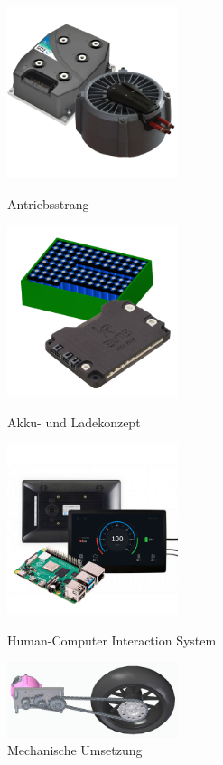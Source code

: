 \begin{figure}[H] 
    \RawFloats
	\centering 
	\begin{minipage}[t]{4cm} 
		\centering 
		\includegraphics[width=5cm]{figures/allgemein/antrieb.png} 
		\captionsetup{labelformat=empty}
		\caption{Antriebsstrang} 
	\end{minipage} 
	\hspace{3cm} 
	\begin{minipage}[t]{4cm} 
		\centering 
		\includegraphics[width=5cm]{figures/allgemein/akku.png}
		\captionsetup{labelformat=empty}
		\caption{Akku- und Ladekonzept} 
	\end{minipage} 
	
	\begin{minipage}[t]{4cm} 
		\centering 
		\includegraphics[width=5cm]{figures/allgemein/hcis.png}
		\captionsetup{labelformat=empty}
		\caption{Human-Computer Interaction System} 
	\end{minipage} 
	\hspace{3cm} 
	\begin{minipage}[t]{4cm} 
		\centering 
		\includegraphics[width=5cm]{figures/allgemein/mechanik.jpg}
		\captionsetup{labelformat=empty}
		\caption{Mechanische Umsetzung} 
	\end{minipage} 
\end{figure} 

